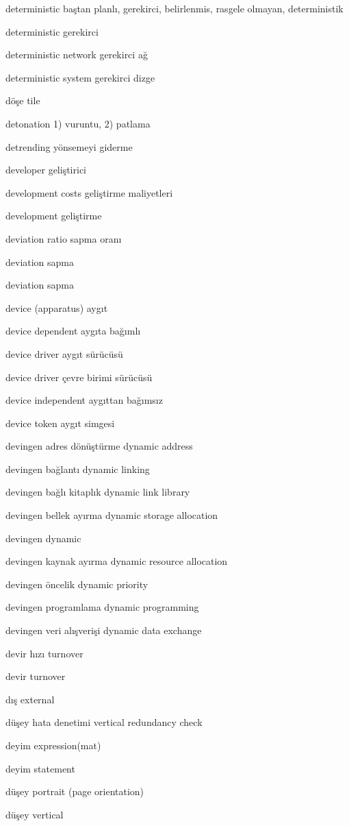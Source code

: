 \documentclass[12pt,fleqn]{article}\usepackage{../../common}
\begin{document}
deterministic baştan planlı, gerekirci, belirlenmis, rasgele olmayan, deterministik

deterministic gerekirci

deterministic network gerekirci ağ

deterministic system gerekirci dizge

döşe tile

detonation 1) vuruntu, 2) patlama

detrending yönsemeyi giderme

developer geliştirici

development costs geliştirme maliyetleri

development geliştirme

deviation ratio sapma oranı

deviation sapma

deviation sapma

device (apparatus) aygıt

device dependent aygıta bağımlı

device driver aygıt sürücüsü

device driver çevre birimi sürücüsü

device independent aygıttan bağımsız

device token aygıt simgesi

devingen adres dönüştürme dynamic address

devingen bağlantı dynamic linking

devingen bağlı kitaplık dynamic link library

devingen bellek ayırma dynamic storage allocation

devingen dynamic

devingen kaynak ayırma dynamic resource allocation

devingen öncelik dynamic priority

devingen programlama dynamic programming

devingen veri alışverişi dynamic data exchange

devir hızı turnover

devir turnover

dış external

düşey hata denetimi vertical redundancy check

deyim expression(mat)

deyim statement

düşey portrait (page orientation)

düşey vertical
\end{document}
